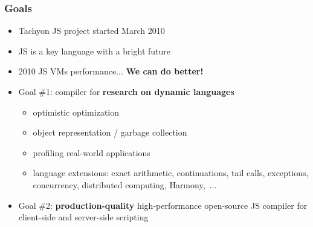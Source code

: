 \begin{frame}
\frametitle{\bf Goals}

  \begin{itemize}

  \item Tachyon JS project started March 2010
    \smallskip

  \item JS is a key language with a bright future
    \smallskip

  \item 2010 JS VMs performance... {\bf We can do better!}
    \smallskip

    \bigskip

  \item Goal \#1: compiler for {\bf research on dynamic languages}
    \begin{itemize}
    \item optimistic optimization
    \item object representation / garbage collection
    \item profiling real-world applications
    \item language extensions: exact arithmetic, continuations, tail calls, exceptions, concurrency, distributed computing, Harmony,~...
    \end{itemize}
    \smallskip

  \item Goal \#2: {\bf production-quality} high-performance open-source
    JS compiler for client-side and server-side scripting

  \end{itemize}

\end{frame}

